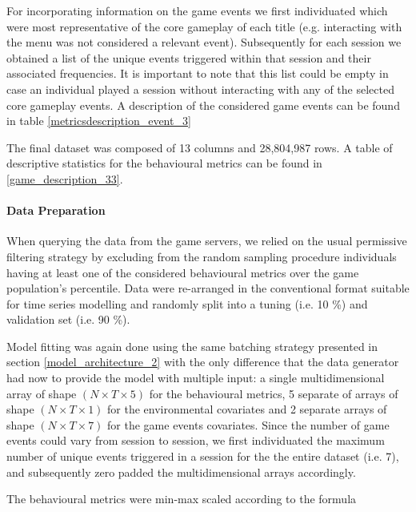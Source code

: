 

For incorporating information on the game events we first individuated which were most representative of the core gameplay of each title (e.g. interacting with the menu was not considered a relevant event). Subsequently for each session we obtained a list of the unique events triggered within that session and their associated frequencies. It is important to note that this list could be empty in case an individual played a session without interacting with any of the selected core gameplay events. A description of the considered game events can be found in table \ref{metricsdescription_event_3}



The final dataset was composed of 13 columns and 28,804,987 rows. A table of descriptive statistics for the behavioural metrics can be found in \ref{game_description_33}.



\paragraph*{Data Preparation} When querying the data from the game servers, we relied on the usual permissive filtering strategy by excluding from the random sampling procedure individuals having at least one of the considered behavioural metrics over the game population's  percentile. Data were re-arranged in the conventional format suitable for time series modelling and randomly split into a tuning (i.e. 10 \%) and validation set (i.e. 90 \%). 

Model fitting was again done using the same batching strategy presented in section \ref{model_architecture_2} with the only difference that the data generator had now to provide the model with multiple input: a single multidimensional array of shape $(N \times T \times 5)$ for the behavioural metrics, 5 separate of arrays of shape $(N \times T \times 1)$ for the environmental covariates and 2 separate arrays of shape $(N \times T \times 7)$ for the game events covariates. Since the number of game events could vary from session to session, we first individuated the maximum number of unique events triggered in a session for the the entire dataset (i.e. 7), and subsequently zero padded the multidimensional arrays accordingly.

The behavioural metrics were min-max scaled according to the formula

